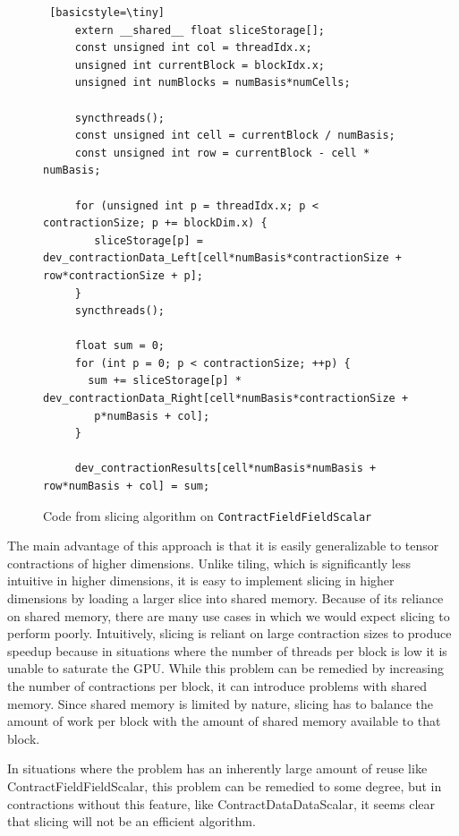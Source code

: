 \begin{figure}[ht]
    \begin{lstlisting} [basicstyle=\tiny]
     extern __shared__ float sliceStorage[];
     const unsigned int col = threadIdx.x;
     unsigned int currentBlock = blockIdx.x;
     unsigned int numBlocks = numBasis*numCells;
     
     syncthreads();
     const unsigned int cell = currentBlock / numBasis;
     const unsigned int row = currentBlock - cell * numBasis;

     for (unsigned int p = threadIdx.x; p < contractionSize; p += blockDim.x) {
        sliceStorage[p] = dev_contractionData_Left[cell*numBasis*contractionSize + row*contractionSize + p];
     }
     syncthreads();

     float sum = 0;
     for (int p = 0; p < contractionSize; ++p) {
       sum += sliceStorage[p] * dev_contractionData_Right[cell*numBasis*contractionSize +
        p*numBasis + col];
     }

     dev_contractionResults[cell*numBasis*numBasis + row*numBasis + col] = sum;
 \end{lstlisting}
\caption{Code from slicing algorithm on \texttt{ContractFieldFieldScalar}
\label{lst:ContractFieldFieldScalarSlice}} 
\end{figure}

    The main advantage of this approach is that it is easily generalizable to
tensor contractions of higher dimensions. Unlike tiling, which is significantly
less intuitive in higher dimensions, it is easy to implement slicing in higher
dimensions by loading a larger slice into shared memory. Because of its
reliance on shared memory, there are many use cases in which we would expect
slicing to perform poorly. Intuitively, slicing is reliant on large contraction
sizes to produce speedup because in situations where the number of threads per
block is low it is unable to saturate the GPU. While this problem can be
remedied by increasing the number of contractions per block, it can introduce
problems with shared memory. Since shared memory is limited by nature, slicing
has to balance the amount of work per block with the amount of shared memory
available to that block.
	
    In situations where the problem has an inherently large amount of reuse
like ContractFieldFieldScalar, this problem can be remedied to some degree, but
in contractions without this feature, like ContractDataDataScalar, it seems
clear that slicing will not be an efficient algorithm. 
	
